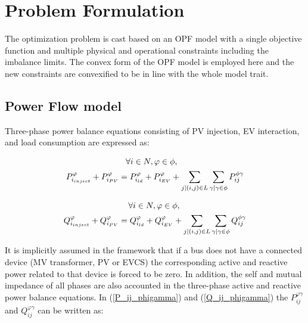 \documentclass[journal]{IEEEtran}
\begin{document}
\section{Problem Formulation}

The optimization problem is cast based on an OPF model with a single objective function and multiple physical and operational constraints including the imbalance limits. The convex form of the OPF model is employed here and the new constraints are convexified to be in line with the whole model trait.

\subsection {Power Flow model}

Three-phase power balance equations consisting of PV injection, EV interaction, and load consumption are expressed as:

\begin{equation}\label{P_ij_phigamma}
\begin{split}
\forall i\in N,\varphi\in\phi, \hskip 80pt\\
P_{i_{inject}}^{\varphi}+P_{i_{PV}}^{\varphi}=P_{i_{ld}}^{\varphi}+P_{i_{EV}}^{\varphi}+
\displaystyle\sum_{j|(i,j)\in L}\displaystyle\sum_{\gamma|\gamma\in\phi}P_{ij}^{\phi\gamma}
\end{split}
\end{equation}


\begin{center}
\begin{equation}\label{Q_ij_phigamma}
\begin{split}
\forall i\in N,\varphi\in\phi, \hskip 80pt\\ Q_{i_{inject}}^{\varphi}+Q_{i_{PV}}^{\varphi}=Q_{i_{ld}}^{\varphi}+Q_{i_{EV}}^{\varphi}+
\displaystyle\sum_{j|(i,j)\in L}\displaystyle\sum_{\gamma|\gamma\in\phi}Q_{ij}^{\phi\gamma}
\end{split}
\end{equation}
\end{center}

It is implicitly assumed in the framework that if a bus does not have a connected device (MV transformer, PV or EVCS) the corresponding active and reactive power related to that device is forced to be zero. In addition, the self and mutual impedance of all phases are also accounted in the three-phase active and reactive power balance equations. In (\ref{P_ij_phigamma}) and (\ref{Q_ij_phigamma}) the $P_{ij}^{\varphi\gamma}$ and $Q_{ij}^{\varphi\gamma}$ can be written as:
\end{document}
